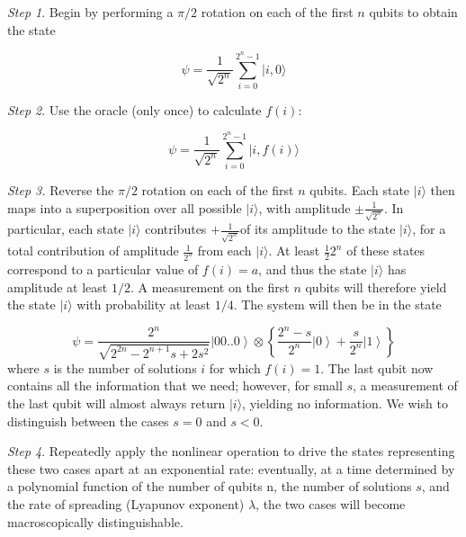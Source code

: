 \documentclass[12pt]{article}
\begin{document}
\medskip\noindent
{\it Step 1}. Begin by performing a $\pi/2$ rotation on each of the first $n$ qubits
to obtain the state%

\begin{equation}
\psi=\frac{1}{\sqrt{2^{n}}}\sum\limits_{i=0}^{2^{n}-1}|i,0\rangle
\end{equation}

\medskip\noindent
{\it Step 2}. Use the oracle (only once) to calculate $f(i)$:%

\begin{equation}
\psi=\frac{1}{\sqrt{2^{n}}}\sum\limits_{i=0}^{2^{n}-1}|i,f(i)\rangle
\end{equation}

\medskip\noindent
{\it Step 3.} Reverse the $\pi/2$ rotation on each of the first $n$ qubits. Each
state $\vert i \rangle$ then maps into a superposition over all possible
$\vert i \rangle$, with amplitude $\pm\frac{1}{\sqrt{2^{n}}}$. In particular, each state
$\vert i \rangle$ contributes $+\frac{1}{\sqrt{2^{n}}}$of its amplitude to the state
$\vert i \rangle$, for a total contribution of amplitude $\frac{1}{2^{n}}$ from each
$\vert i \rangle$. At least $\frac{1}{2}2^{n}$ of these states correspond to a particular value
of $f(i)=a$, and thus the state
$\vert i \rangle$
has amplitude at least $1/2$. A measurement on the first $n$ qubits will therefore
yield the state
$\vert i \rangle$
with probability at least $1/4$. The system will then be in the state%

\begin{equation}
\psi=\frac{2^{n}}{\sqrt{2^{2n}-2^{n+1}s+2s^{2}}}\left|  00..0\right\rangle
\otimes\left\{  \frac{2^{n}-s}{2^{n}}\left|  0\right\rangle +\frac{s}{2^{n}%
}\left|  1\right\rangle \right\}
\end{equation}
where $s$ is the number of solutions $i$ for which $f(i)=1$. The last qubit now
contains all the information that we need; however, for small $s$, a measurement
of the last qubit will almost always return $\vert i \rangle$, yielding no information. 
We wish to distinguish between the cases $s=0$ and $s<0$.

\medskip\noindent
{\it Step 4}. Repeatedly apply the nonlinear operation to drive the states
representing these two cases apart at an exponential rate: eventually, at a
time determined by a polynomial function of the number of qubits n, the number
of solutions $s$, and the rate of spreading (Lyapunov exponent) $\lambda$, the
two cases will become macroscopically distinguishable.
\end{document}
